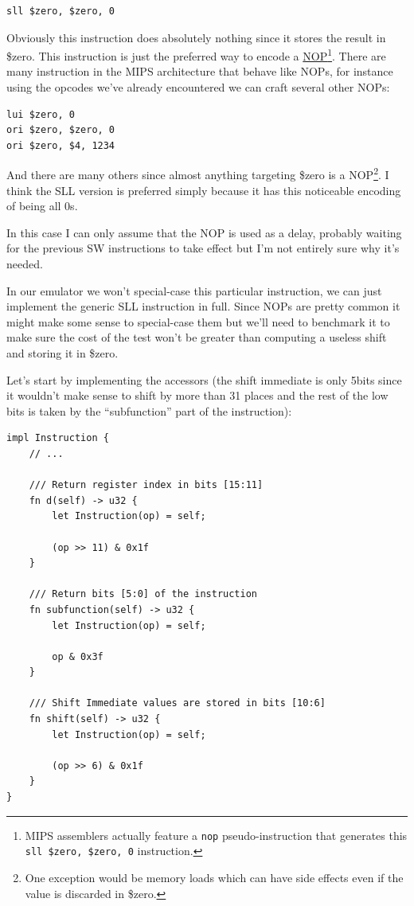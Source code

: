 \documentclass[a4paper]{article}
\newcommand{\code}[1] {\texttt{#1}}
\begin{document}
\begin{lstlisting}[language=assembly]
sll $zero, $zero, 0
\end{lstlisting}

Obviously this instruction does absolutely nothing since it stores the
result in \$zero. This instruction is just the preferred way to encode
a \href{https://en.wikipedia.org/wiki/NOP}{NOP}\footnote{MIPS
  assemblers actually feature a \code{nop} pseudo-instruction that
  generates this \mbox{\code{sll \$zero, \$zero, 0}} instruction.}.
There are many instruction in the MIPS architecture that behave like
NOPs, for instance using the opcodes we've already encountered we can
craft several other NOPs:

\begin{lstlisting}[language=assembly]
lui $zero, 0
ori $zero, $zero, 0
ori $zero, $4, 1234
\end{lstlisting}

And there are many others since almost anything targeting \$zero is a
NOP\footnote{One exception would be memory loads which can have side
  effects even if the value is discarded in \$zero.}. I think the SLL
version is preferred simply because it has this noticeable encoding of
being all 0s.

In this case I can only assume that the NOP is used as a delay,
probably waiting for the previous SW instructions to take effect but
I'm not entirely sure why it's needed.

In our emulator we won't special-case this particular instruction, we
can just implement the generic SLL instruction in full. Since NOPs are
pretty common it might make some sense to special-case them but we'll
need to benchmark it to make sure the cost of the test won't be
greater than computing a useless shift and storing it in \$zero.

Let's start by implementing the accessors (the shift immediate is only
5bits since it wouldn't make sense to shift by more than 31 places and
the rest of the low bits is taken by the ``subfunction'' part of the
instruction):

\begin{lstlisting}
impl Instruction {
    // ...

    /// Return register index in bits [15:11]
    fn d(self) -> u32 {
        let Instruction(op) = self;

        (op >> 11) & 0x1f
    }

    /// Return bits [5:0] of the instruction
    fn subfunction(self) -> u32 {
        let Instruction(op) = self;

        op & 0x3f
    }

    /// Shift Immediate values are stored in bits [10:6]
    fn shift(self) -> u32 {
        let Instruction(op) = self;

        (op >> 6) & 0x1f
    }
}
\end{lstlisting}
\end{document}
